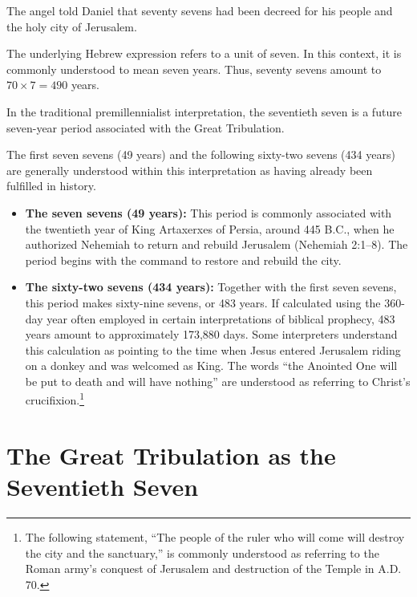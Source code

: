 The angel told Daniel that seventy sevens had been decreed for his people and the holy city of Jerusalem.

The underlying Hebrew expression refers to a unit of seven. In this context, it is commonly understood to mean seven years. Thus, seventy sevens amount to \(70 \times 7 = 490\) years.

In the traditional premillennialist interpretation, the seventieth seven is a future seven-year period associated with the Great Tribulation.

The first seven sevens (49 years) and the following sixty-two sevens (434 years) are generally understood within this interpretation as having already been fulfilled in history.

\begin{itemize}
\item \textbf{The seven sevens (49 years):} This period is commonly associated with the twentieth year of King Artaxerxes of Persia, around 445 B.C., when he authorized Nehemiah to return and rebuild Jerusalem (Nehemiah 2:1--8). The period begins with the command to restore and rebuild the city.

\item \textbf{The sixty-two sevens (434 years):} Together with the first seven sevens, this period makes sixty-nine sevens, or 483 years. If calculated using the 360-day year often employed in certain interpretations of biblical prophecy, 483 years amount to approximately 173,880 days. Some interpreters understand this calculation as pointing to the time when Jesus entered Jerusalem riding on a donkey and was welcomed as King. The words ``the Anointed One will be put to death and will have nothing'' are understood as referring to Christ's crucifixion.\footnote{The following statement, ``The people of the ruler who will come will destroy the city and the sanctuary,'' is commonly understood as referring to the Roman army's conquest of Jerusalem and destruction of the Temple in A.D. 70.}
\end{itemize}

\section*{The Great Tribulation as the Seventieth Seven}

